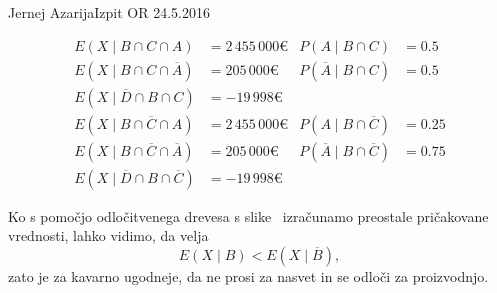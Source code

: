 \begin{naloga}{Jernej Azarija}{Izpit OR 24.5.2016}
\begin{odgovor}
\begin{align*}
E(X \mid B \cap C \cap A) &=2\,455\,000 € &
P(A \mid B \cap C) &= 0.5 \\
E(X \mid B \cap C \cap \overline{A}) &=205\,000 € &
P(\overline{A} \mid B \cap C) &= 0.5 \\
E(X \mid \overline{D} \cap B \cap C) &= -19\,998 € \\[1ex]
E(X \mid B \cap \overline{C} \cap A) &=2\,455\,000 € &
P(A \mid B \cap \overline{C}) &= 0.25 \\
E(X \mid B \cap \overline{C} \cap \overline{A}) &=205\,000 € &
P(\overline{A} \mid B \cap \overline{C}) &= 0.75 \\
E(X \mid \overline{D} \cap B \cap \overline{C}) &= -19\,998 €
\end{align*}

Ko s pomočjo odločitvenega drevesa s slike~\fig
izračunamo preostale pričakovane vrednosti,
lahko vidimo, da velja
$$
E(X \mid B) < E(X \mid \overline{B}) ,
$$
zato je za kavarno ugodneje,
da ne prosi za nasvet in se odloči za proizvodnjo.

\begin{slika}
\makebox[\textwidth][c]{
\pgfslika
}
\end{slika}
\end{odgovor}
\end{naloga}

